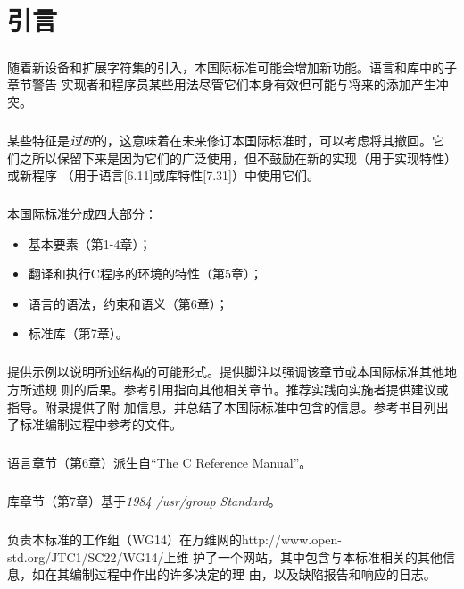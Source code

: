 \chapter*{引言}

\setcounter{paragraph}{0}

\paragraph{}
随着新设备和扩展字符集的引入，本国际标准可能会增加新功能。语言和库中的子章节警告
实现者和程序员某些用法尽管它们本身有效但可能与将来的添加产生冲突。

\paragraph{}
某些特征是\textit{过时}的，这意味着在未来修订本国际标准时，可以考虑将其撤回。它
们之所以保留下来是因为它们的广泛使用，但不鼓励在新的实现（用于实现特性）或新程序
（用于语言[6.11]或库特性[7.31]）中使用它们。

\paragraph{}
本国际标准分成四大部分：
\begin{itemize}
  \item{基本要素（第1-4章）；}
  \item{翻译和执行C程序的环境的特性（第5章）；}
  \item{语言的语法，约束和语义（第6章）；}
  \item{标准库（第7章）。}
\end{itemize}

\paragraph{}
提供示例以说明所述结构的可能形式。提供脚注以强调该章节或本国际标准其他地方所述规
则的后果。参考引用指向其他相关章节。推荐实践向实施者提供建议或指导。附录提供了附
加信息，并总结了本国际标准中包含的信息。参考书目列出了标准编制过程中参考的文件。

\paragraph{}
语言章节（第6章）派生自``The C Reference Manual''。

\paragraph{}
库章节（第7章）基于\textit{1984 /usr/group Standard}。

\paragraph{}
负责本标准的工作组（WG14）在万维网的http://www.open-std.org/JTC1/SC22/WG14/上维
护了一个网站，其中包含与本标准相关的其他信息，如在其编制过程中作出的许多决定的理
由，以及缺陷报告和响应的日志。

